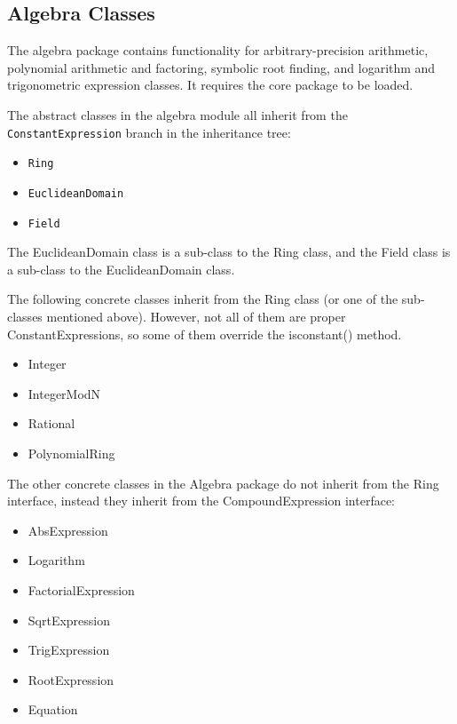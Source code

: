 \documentclass{article}
\begin{document}

\subsection{Algebra Classes}

The algebra package contains functionality for arbitrary-precision arithmetic, polynomial arithmetic and factoring, symbolic root finding, and logarithm and trigonometric expression classes. It requires the core package to be loaded.

The abstract classes in the algebra module all inherit from the \texttt{ConstantExpression} branch in the inheritance tree:

\begin{itemize}
    \item \texttt{Ring}
    \item \texttt{EuclideanDomain}
    \item \texttt{Field}
\end{itemize}

The {\ttfamily EuclideanDomain} class is a sub-class to the {\ttfamily Ring} class, and the {\ttfamily Field} class is a sub-class to the {\ttfamily EuclideanDomain} class.

The following concrete classes inherit from the {\ttfamily Ring} class (or one of the sub-classes mentioned above). However, not all of them are proper {\ttfamily ConstantExpression}s, so some of them override the {\ttfamily isconstant()} method.

\begin{itemize}
    \item {\ttfamily Integer}
    \item {\ttfamily IntegerModN}
    \item {\ttfamily Rational}
    \item {\ttfamily PolynomialRing}
\end{itemize}

The other concrete classes in the Algebra package do not inherit from the {\ttfamily Ring} interface, instead they inherit from the {\ttfamily CompoundExpression} interface:

\begin{itemize}
    \item {\ttfamily AbsExpression}
    \item {\ttfamily Logarithm}
    \item {\ttfamily FactorialExpression}
    \item {\ttfamily SqrtExpression}
    \item {\ttfamily TrigExpression}
    \item {\ttfamily RootExpression}
    \item {\ttfamily Equation}
\end{itemize}
\end{document}
